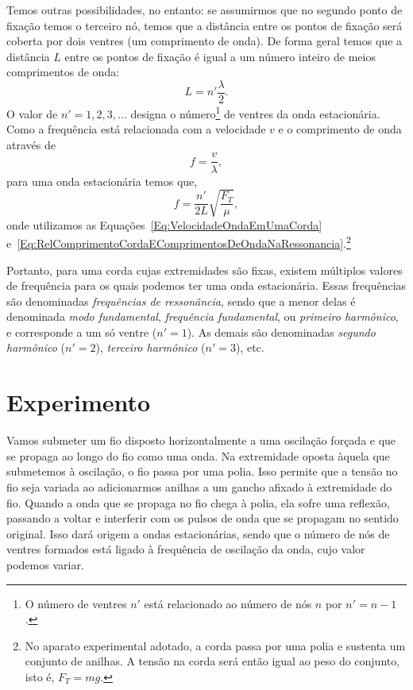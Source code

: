 Temos outras possibilidades, no entanto: se assumirmos que no segundo ponto de fixação temos o terceiro nó, temos que a distância entre os pontos de fixação será coberta por dois ventres (um comprimento de onda). De forma geral temos que a distância $L$ entre os pontos de fixação é igual a um número inteiro de meios comprimentos de onda:
\begin{equation}\label{Eq:RelComprimentoCordaEComprimentosDeOndaNaRessonancia}
    L = n'\frac{\lambda}{2}.
\end{equation}
%
O valor de $n' = 1, 2, 3, \dots$ designa o número\footnote{O número de ventres $n'$ está relacionado ao número de nós $n$ por $n'=n-1$.} de ventres da onda estacionária. Como a frequência está relacionada com a velocidade $v$ e o comprimento de onda através de
\begin{equation}
	f = \frac{v}{\lambda},
\end{equation}
%
para uma onda estacionária temos que,
\begin{equation}\label{Eq:RelacaoVariaveisOndasEstacionarias}
	f = \frac{n'}{2L}\sqrt{\frac{F_T}{\mu}},
\end{equation}
%
onde utilizamos as Equações~\eqref{Eq:VelocidadeOndaEmUmaCorda} e~\eqref{Eq:RelComprimentoCordaEComprimentosDeOndaNaRessonancia}.\footnote{No aparato experimental adotado, a corda passa por uma polia e sustenta um conjunto de anilhas. A tensão na corda será então igual ao peso do conjunto, isto é, $F_T = mg$.}

Portanto, para uma corda cujas extremidades são fixas, existem múltiplos valores de frequência para os quais podemos ter uma onda estacionária. Essas frequências são denominadas \emph{frequências de ressonância}, sendo que a menor delas é denominada \emph{modo fundamental}, \emph{frequência fundamental}, ou \emph{primeiro harmônico}, e corresponde a um só ventre ($n'=1$). As demais são denominadas \emph{segundo harmônico} ($n'=2$), \emph{terceiro harmônico} ($n'=3$), etc.

\section{Experimento}

Vamos submeter um fio disposto horizontalmente a uma oscilação forçada e que se propaga ao longo do fio como uma onda. Na extremidade oposta àquela que submetemos à oscilação, o fio passa por uma polia. Isso permite que a tensão no fio seja variada ao adicionarmos anilhas a um gancho afixado à extremidade do fio. Quando a onda que se propaga no fio chega à polia, ela sofre uma reflexão, passando a voltar e interferir com os pulsos de onda que se propagam no sentido original. Isso dará origem a ondas estacionárias, sendo que o número de nós de ventres formados está ligado à frequência de oscilação da onda, cujo valor podemos variar.


